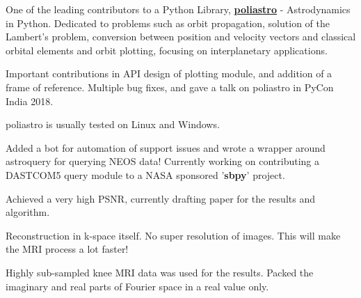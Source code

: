 \documentclass[a4paper]{deedy-resume-openfont}
\begin{document}
\begin{minipage}[t]{0.66\textwidth}
\begin{tightemize}
\item One of the leading contributors to a Python Library, \textbf{\href{http://github.com/poliastro/poliastro}{poliastro}} - Astrodynamics in Python. Dedicated to problems such as orbit propagation, solution of the Lambert's problem, conversion between position and velocity vectors and classical orbital elements and orbit plotting, focusing on interplanetary applications.
\item Important contributions in API design of plotting module, and addition of a frame of reference. Multiple bug fixes, and gave a talk on poliastro in PyCon India 2018. 
\item poliastro is usually tested on Linux and Windows. 
\item Added a bot for automation of support issues and wrote a wrapper around astroquery for querying NEOS data! Currently working on contributing a DASTCOM5 query module to a NASA sponsored  '\textbf{sbpy}' project.
\end{tightemize}
\sectionsep

\begin{tightemize}
\item Achieved a very high PSNR, currently drafting paper for the results and algorithm.
\item Reconstruction in k-space itself. No super resolution of images. This will make the MRI process a lot faster!
\item Highly sub-sampled knee MRI data was used for the results. Packed the imaginary and real parts of Fourier space in a real value only.
\end{tightemize}



\end{minipage}
\end{document}

